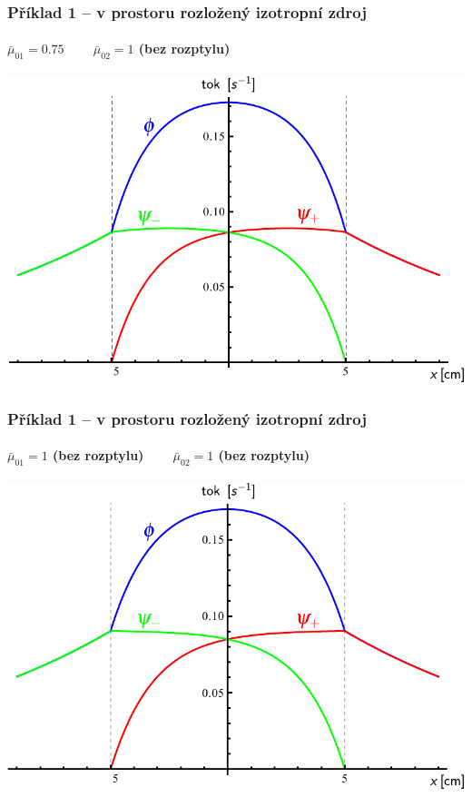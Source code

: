 \begin{frame}
  \frametitle{Příklad 1 -- v prostoru rozložený izotropní zdroj}
  \framesubtitle{$\bar\mu_{01} = 0.75$~~~~$\bar\mu_{02} = 1$ (bez rozptylu)}
  
  \centering\includegraphics[height=.8\paperheight]{obr/doleva_doprava/distribuovany_075_1}

\end{frame}

\begin{frame}
  \frametitle{Příklad 1 -- v prostoru rozložený izotropní zdroj}
  \framesubtitle{$\bar\mu_{01} = 1$ (bez rozptylu)~~~~$\bar\mu_{02} = 1$ (bez rozptylu)}
  
  \centering\includegraphics[height=.8\paperheight]{obr/doleva_doprava/distribuovany_1_1}

\end{frame}

